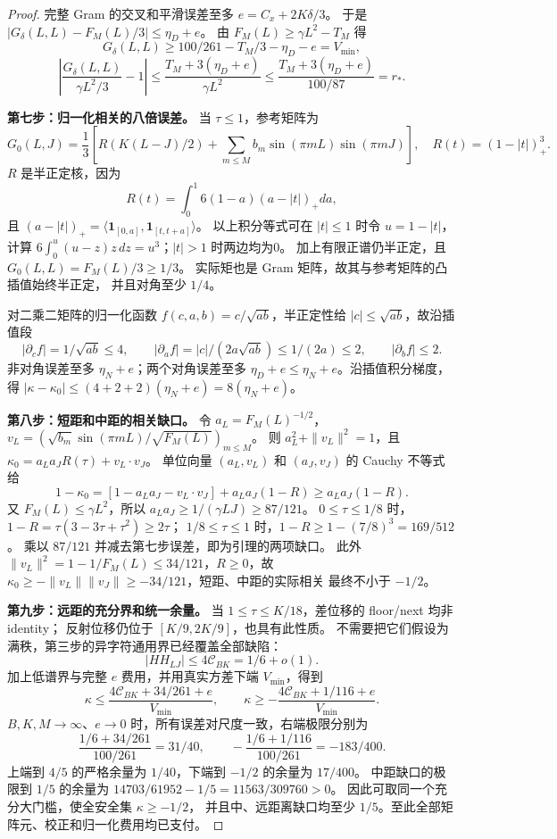 \begin{proof}
完整 Gram 的交叉和平滑误差至多 $e=C_x+2K\delta/3$。
于是 $|G_\delta(L,L)-F_M(L)/3|\le\eta_D+e$。
由 $F_M(L)\ge\gamma L^2-T_M$ 得
\[
 G_\delta(L,L)\ge100/261-T_M/3-\eta_D-e=V_{\min},
\]
\[
 \left|\frac{G_\delta(L,L)}{\gamma L^2/3}-1\right|
 \le\frac{T_M+3(\eta_D+e)}{\gamma L^2}
 \le\frac{T_M+3(\eta_D+e)}{100/87}=r_*.
\]

\textbf{第七步：归一化相关的八倍误差。}
当 $\tau\le1$，参考矩阵为
\[
 G_0(L,J)=\frac13\left[R(K(L-J)/2)
 +\sum_{m\le M}b_m\sin(\pi mL)\sin(\pi mJ)\right],
 \quad R(t)=(1-|t|)_+^3.
\]
$R$ 是半正定核，因为
\[
 R(t)=\int_0^1 6(1-a)(a-|t|)_+da,
\]
且 $(a-|t|)_+=\langle\mathbf1_{[0,a]},\mathbf1_{[t,t+a]}\rangle$。
以上积分等式可在 $|t|\le1$ 时令 $u=1-|t|$，计算
$6\int_0^u(u-z)z\,dz=u^3$；$|t|>1$ 时两边均为0。
加上有限正谱仍半正定，且 $G_0(L,L)=F_M(L)/3\ge1/3$。
实际矩也是 Gram 矩阵，故其与参考矩阵的凸插值始终半正定，
并且对角至少 $1/4$。

对二乘二矩阵的归一化函数 $f(c,a,b)=c/\sqrt{ab}$，半正定性给
$|c|\le\sqrt{ab}$，故沿插值段
\[
 |\partial_cf|=1/\sqrt{ab}\le4,\qquad
 |\partial_af|=|c|/(2a\sqrt{ab})\le1/(2a)\le2,
 \qquad|\partial_bf|\le2.
\]
非对角误差至多 $\eta_N+e$；两个对角误差至多
$\eta_D+e\le\eta_N+e$。沿插值积分梯度，得
$|\kappa-\kappa_0|\le(4+2+2)(\eta_N+e)=8(\eta_N+e)$。

\textbf{第八步：短距和中距的相关缺口。}
令 $a_L=F_M(L)^{-1/2}$，
$v_L=(\sqrt{b_m}\sin(\pi mL)/\sqrt{F_M(L)})_{m\le M}$。
则 $a_L^2+\|v_L\|^2=1$，且
$\kappa_0=a_La_JR(\tau)+v_L\cdot v_J$。
单位向量 $(a_L,v_L)$ 和 $(a_J,v_J)$ 的 Cauchy 不等式给
\[
 1-\kappa_0=[1-a_La_J-v_L\cdot v_J]+a_La_J(1-R)
 \ge a_La_J(1-R).
\]
又 $F_M(L)\le\gamma L^2$，所以
$a_La_J\ge1/(\gamma LJ)\ge87/121$。
$0\le\tau\le1/8$ 时，
$1-R=\tau(3-3\tau+\tau^2)\ge2\tau$；
$1/8\le\tau\le1$ 时，$1-R\ge1-(7/8)^3=169/512$。
乘以 $87/121$ 并减去第七步误差，即为引理的两项缺口。
此外 $\|v_L\|^2=1-1/F_M(L)\le34/121$，$R\ge0$，故
$\kappa_0\ge-\|v_L\|\|v_J\|\ge-34/121$，短距、中距的实际相关
最终不小于 $-1/2$。

\textbf{第九步：远距的充分界和统一余量。}
当 $1\le\tau\le K/18$，差位移的 floor/next 均非identity；
反射位移仍位于 $[K/9,2K/9]$，也具有此性质。
不需要把它们假设为满秩，第三步的异字符通用界已经覆盖全部缺陷：
\[
 |HH_{LJ}|\le4\mathcal C_{BK}=1/6+o(1).
\]
加上低谱界与完整 $e$ 费用，并用真实方差下端 $V_{\min}$，得到
\[
 \kappa\le\frac{4\mathcal C_{BK}+34/261+e}{V_{\min}},
 \qquad\kappa\ge-\frac{4\mathcal C_{BK}+1/116+e}{V_{\min}}.
\]
$B,K,M\to\infty$、$e\to0$ 时，所有误差对尺度一致，右端极限分别为
\[
 \frac{1/6+34/261}{100/261}=31/40,
 \qquad-\frac{1/6+1/116}{100/261}=-183/400.
\]
上端到 $4/5$ 的严格余量为 $1/40$，下端到 $-1/2$ 的余量为 $17/400$。
中距缺口的极限到 $1/5$ 的余量为
$14703/61952-1/5=11563/309760>0$。
因此可取同一个充分大门槛，使全安全集 $\kappa\ge-1/2$，
并且中、远距离缺口均至少 $1/5$。至此全部矩阵元、校正和归一化费用均已支付。
\end{proof}

